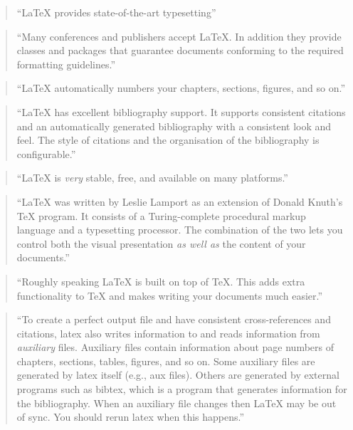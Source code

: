 \documentclass[]{tufte-book}
\begin{document}
\begin{quote}
``LaTeX provides state-of-the-art typesetting'' \citep{van2012latex}
\end{quote}

\begin{quote}
``Many conferences and publishers accept LaTeX. In addition they provide
classes and packages that guarantee documents conforming to the required
formatting guidelines.'' \citep{van2012latex}
\end{quote}

\begin{quote}
``LaTeX automatically numbers your chapters, sections, figures, and so on.''
\citep{van2012latex}
\end{quote}

\begin{quote}
``LaTeX has excellent bibliography support. It supports consistent citations
and an automatically generated bibliography with a consistent look and
feel. The style of citations and the organisation of the bibliography
is configurable.'' \citep{van2012latex}
\end{quote}

\begin{quote}
``LaTeX is \emph{very} stable, free, and available on many platforms.''
\citep{van2012latex}
\end{quote}

\begin{quote}
``LaTeX was written by Leslie Lamport as an extension of Donald Knuth's
TeX program. It consists of a Turing-complete procedural markup language
and a typesetting processor. The combination of the two lets you control
both the visual presentation \emph{as well as} the content of your documents.''
\citep{van2012latex}
\end{quote}

\begin{quote}
``Roughly speaking LaTeX is built on top of TeX. This adds extra functionality
to TeX and makes writing your documents much easier.'' \citep{van2012latex}
\end{quote}

\begin{quote}
``To create a perfect output file and have consistent cross-references
and citations, latex also writes information to and reads information from
\emph{auxiliary} files. Auxiliary files contain information about page numbers of
chapters, sections, tables, figures, and so on. Some auxiliary files are
generated by latex itself (e.g., aux files). Others are generated by
external programs such as bibtex, which is a program that generates information
for the bibliography. When an auxiliary file changes then LaTeX may be out
of sync. You should rerun latex when this happens.'' \citep{van2012latex}
\end{quote}
\end{document}
